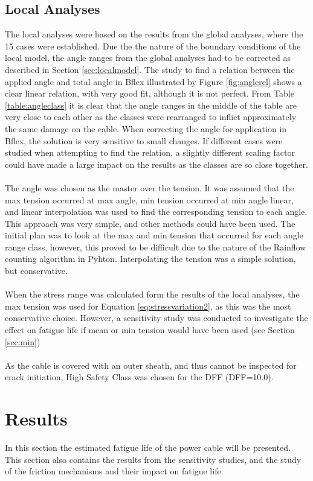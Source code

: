 \subsection{Local Analyses}
The local analyses were based on the results from the global analyses, where the 15 cases were established. Due the the nature of the boundary conditions of the local model, the angle ranges from the global analyses had to be corrected as described in Section \ref{sec:localmodel}. The study to find a relation between the applied angle and total angle in Bflex illustrated by Figure \ref{fig:anglerel} shows a clear linear relation, with very good fit, although it is not perfect. From Table \ref{table:angleclass} it is clear that the angle ranges in the middle of the table are very close to each other as the classes were rearranged to inflict approximately the same damage on the cable. When correcting the angle for application in Bflex, the solution is very sensitive to small changes. If different cases were studied when attempting to find the relation, a slightly different scaling factor could have made a large impact on the results as the classes are so close together.\\\\
The angle was chosen as the master over the tension. It was assumed that the max tension occurred at max angle, min tension occurred at min angle linear, and linear interpolation was used to find the corresponding tension to each angle. This approach was very simple, and other methods could have been used. The initial plan was to look at the max and min tension that occurred for each angle range class, however, this proved to be difficult due to the nature of the Rainflow counting algorithm in Pyhton. Interpolating the tension was a simple solution, but conservative.\\\\
When the stress range was calculated form the results of the local analyses, the max tension was used for Equation \ref{eq:stressvariation2}, as this was the most conservative choice. However, a sensitivity study was conducted to investigate the effect on fatigue life if mean or min tension would have been used (see Section \ref{sec:min})\\\\ As the cable is covered with an outer sheath, and thus cannot be inspected for crack initiation, High Safety Class was chosen for the DFF (DFF=10.0). 
\section{Results}
In this section the estimated fatigue life of the power cable will be presented. This section also contains the results from the sensitivity studies, and the study of the friction mechanisms and their impact on fatigue life.

